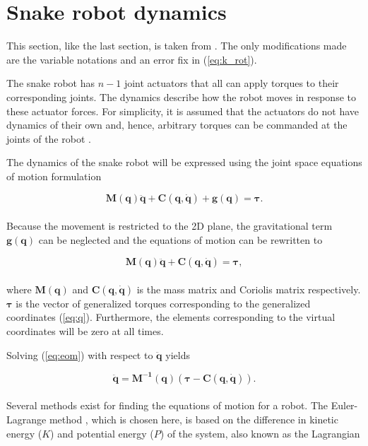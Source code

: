 \section{Snake robot dynamics} \label{sec:dyn}

This section, like the last section, is taken from \cite{AtussaProsjektoppgp}. The only modifications made are the variable notations and an error fix in (\ref{eq:k_rot}).

The snake robot has $n-1$ joint actuators that all can apply torques to their corresponding joints. The dynamics describe how the robot moves in response to these actuator forces. For simplicity, it is assumed that the actuators do not have dynamics of their own and, hence, arbitrary torques can be commanded at the joints of the robot \cite{murray2017mathematical}.

The dynamics of the snake robot will be expressed using the joint space equations of motion formulation

\begin{equation}
    \mathbf{M(q)\ddot{q} + C(q, \dot{q}) + g(q)} = \boldsymbol{\tau}.
\end{equation}
\\
Because the movement is restricted to the 2D plane, the gravitational term $\mathbf{g(q)}$ can be neglected and the equations of motion can be rewritten to

\begin{equation}\label{eq:eom}
    \mathbf{M(q)\ddot{q} + C(q, \dot{q})} = \boldsymbol{\tau},
\end{equation}
\\
where $\mathbf{M(q)}$ and $\mathbf{C(q,\dot{q})}$ is the mass matrix and Coriolis matrix respectively.
$\boldsymbol{\tau}$ is the vector of generalized torques corresponding to the generalized coordinates (\ref{eq:q}). Furthermore, the elements corresponding to the virtual coordinates will be zero at all times.

Solving (\ref{eq:eom}) with respect to $\mathbf{\ddot{q}}$ yields

\begin{equation}\label{eq:eom_qdd}
    \mathbf{\ddot{q}} = \mathbf{M^{-1}(q)}( \boldsymbol{\tau} - \mathbf{C(q, \dot{q})}).
\end{equation}
\\
Several methods exist for finding the equations of motion for a robot. The Euler-Lagrange method \cite{lynch2017modern}, which  is chosen here, is based on the difference in kinetic energy ($K$) and potential energy ($P$) of the system, also known as the Lagrangian

